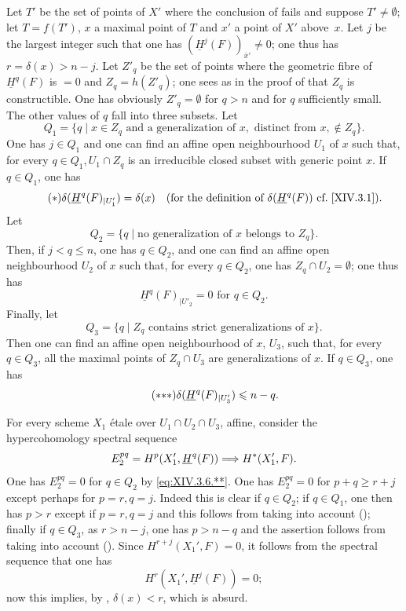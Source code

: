 Let $T'$ be the set of points of $X'$ where the conclusion of  fails and suppose $T' \neq \emptyset$; let $T=f(T')$, $x$ a maximal point of $T$ and $x'$ a point of $X'$ above~$x$. Let $j$ be the largest integer such that one has $(\underline{H}^j(F))_{\bar{x}'} \neq 0$; one thus has $r=\delta(x)>n-j$. Let $Z'_q$ be the set of points where the geometric fibre of $\underline{H}^q(F)$ is $=0$ and $Z_q =h(Z'_q)$; one sees as in the proof of  that $Z_q$ is constructible. One has obviously $Z'_q=\emptyset$ for $q>n$ and for $q$ sufficiently small. The other values of $q$ fall into three subsets. Let
$$
Q_1=\{q\mid x\in Z_q\text{ and a generalization of }x, \text{ distinct from }x, \not\in Z_q\}.
$$
One has $j \in Q_1$ and one can find an affine open neighbourhood $U_1$ of $x$ such that, for every $q \in Q_1, U_1 \cap Z_q$ is an irreducible closed subset with generic point $x$. If $q \in Q_1$, one has
\begin{equation*} \label{eq:XIV.3.6.*} \tag{$*$} \delta(\underline{H}^q(F)_{|U_1'})=\delta(x)\quad\text{(for the definition of $\delta(\underline{H}^q(F))$ \cf \Ref{XIV.3.1})}.
\end{equation*}
Let
$$
Q_2=\{q\mid\text{no generalization of $x$ belongs to }Z_q\}.
$$
Then, if $j<q\leq n$, one has $q\in Q_2$, and one can find an affine open neighbourhood $U_2$ of $x$ such that, for every $q \in Q_2$, one has $Z_q \cap U_2 = \emptyset$; one thus has
\begin{equation*} \label{eq:XIV.3.6.**} \tag{$**$} \underline{H}^q(F)_{|U'_2}=0\text{ for }q\in Q_2.
\end{equation*}
Finally, let
$$
Q_3= \{q\mid Z_q \text{ contains strict generalizations of }x\}.
$$
Then one can find an affine open neighbourhood of $x$, $U_3$, such that, for every $q \in Q_3$, all the maximal points of $Z_q \cap U_3$ are generalizations of $x$. If $q \in Q_3$, one has
\begin{equation*} \label{eq:XIV.3.6.***} \tag{${*}{*}{*}$} \delta(\underline{H}^q(F)_{|U'_3})\leq n-q.
\end{equation*}

For every scheme $X_1$ \'etale over $U_1 \cap U_2 \cap U_3$, affine, consider the hypercohomology spectral sequence
$$
E^{pq}_2= H^p(X_1', \underline{H}^q(F)) \To H^*(X'_1, F).
$$
One has $E^{pq}_2=0$ for $q\in Q_2$ by \eqref{eq:XIV.3.6.**}. One has $E^{pq}_2=0$ for $p+q \geq r+j$ except perhaps for $p=r, q=j$. Indeed this is clear if $q\in Q_2$; if $q\in Q_1$, one then has $p>r$ except if $p=r, q=j$ and this follows from  taking into account (); finally if $q\in Q_3$, as $r>n-j$, one has $p>n-q$ and the assertion follows from  taking into account (). Since $H^{r+j}(X_1', F)=0$, it follows from the spectral sequence that one has
$$H^r(X_1', \underline{H}^j(F))=0;$$
now this implies, by , $\delta(x)<r$, which is absurd.


